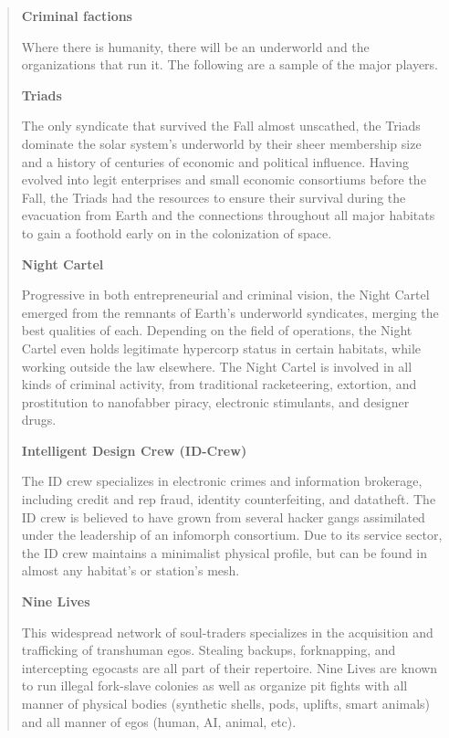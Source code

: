 \begin{quote}
   \textbf{Criminal factions}

   Where there is humanity, there will be an underworld and the organizations
   that run it. The following are a sample of the major players.


   \textbf{Triads}

   The only syndicate that survived the Fall almost unscathed, the Triads
   dominate the solar system's underworld by their sheer membership size and
   a history of centuries of economic and political influence. Having
   evolved into legit enterprises and small economic consortiums before the
   Fall, the Triads had the resources to ensure their survival during the
   evacuation from Earth and the connections throughout all major habitats
   to gain a foothold early on in the colonization of space.


   \textbf{Night Cartel} 

   Progressive in both entrepreneurial and criminal vision, the Night Cartel
   emerged from the remnants of Earth's underworld syndicates, merging the
   best qualities of each. Depending on the field of operations, the Night
   Cartel even holds legitimate hypercorp status in certain habitats, while
   working outside the law elsewhere. The Night Cartel is involved in all
   kinds of criminal activity, from traditional racketeering, extortion, and
   prostitution to nanofabber piracy, electronic stimulants, and designer
   drugs.


   \textbf{Intelligent Design Crew (ID-Crew)}

   The ID crew specializes in electronic crimes and information brokerage,
   including credit and rep fraud, identity counterfeiting, and datatheft.
   The ID crew is believed to have grown from several hacker gangs assimilated
   under the leadership of an infomorph consortium. Due to its service sector,
   the ID crew maintains a minimalist physical profile, but can be found in
   almost any habitat's or station's mesh.


   \textbf{Nine Lives}

   This widespread network of soul-traders specializes in the acquisition and
   trafficking of transhuman egos. Stealing backups, forknapping, and
   intercepting egocasts are all part of their repertoire. Nine Lives are
   known to run illegal fork-slave colonies as well as organize pit fights
   with all manner of physical bodies (synthetic shells, pods, uplifts, smart
   animals) and all manner of egos (human, AI, animal, etc).
\end{quote}

